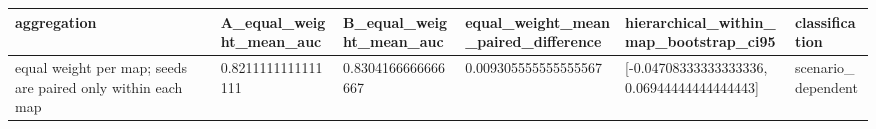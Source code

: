 \begin{tabular}{llllll}
aggregation & A\_equal\_weight\_mean\_auc & B\_equal\_weight\_mean\_auc & equal\_weight\_mean\_paired\_difference & hierarchical\_within\_map\_bootstrap\_ci95 & classification \\
\hline
equal weight per map; seeds are paired only within each map & 0.8211111111111111 & 0.8304166666666667 & 0.009305555555555567 & [-0.04708333333333336, 0.06944444444444443] & scenario\_dependent \\
\end{tabular}
